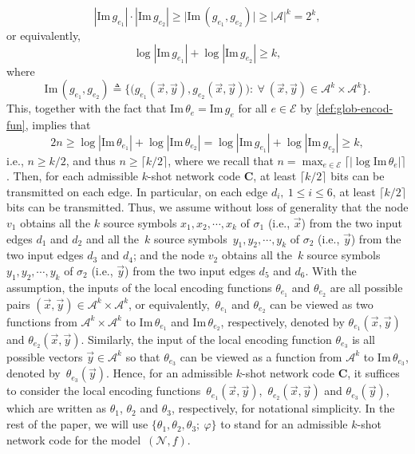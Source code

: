 \documentclass[11pt,draftclsnofoot,onecolumn]{IEEEtran}
\newcommand{\mbC}{\mathbf{C}}
\def\Im{\mathrm{Im}}
\begin{document}
{  \begin{equation}
|\Im\,g_{e_1}|\cdot|\Im\,g_{e_2}|\geq\big|\Im\,(g_{e_1},g_{e_2})\big|\geq |\mathcal{A}|^k=2^k,\nonumber
\end{equation}
or equivalently,
\begin{equation}
\log|\Im\,g_{e_1}|+\log|\Im\,g_{e_2}|\geq k,\nonumber
\end{equation}
where
\begin{equation}
\Im\,(g_{e_1},g_{e_2})\triangleq\Big\{\big(g_{e_1}(\vec{x},\vec{y}),g_{e_2}(\vec{x},\vec{y})\big):~\forall~
(\vec{x},\vec{y})\in\mathcal{A}^k\times\mathcal{A}^k\Big\}.\nonumber
\end{equation}
This, together with the fact that $\Im\,\theta_{e}=\Im\,g_{e}$ for all $e\in\mathcal{E}$ by \eqref{def:glob-encod-fun}, implies that
\begin{equation}
2n\geq \log|\Im\,\theta_{e_1}|+\log|\Im\,\theta_{e_2}|=\log|\Im\,g_{e_1}|+\log|\Im\,g_{e_2}|\geq k,
\nonumber
\end{equation}
i.e., $n\geq k/2$, and thus $n\geq \lceil k/2\rceil$, where we recall that $n=\max_{e\in\mathcal{E}}\big\lceil|\log\Im\,\theta_e|\big\rceil$. Then, for each admissible $k$-shot network
code $\mbC$, at least $\lceil k/2 \rceil$ bits can be transmitted on each edge.
In particular, on each edge $d_{i},~1\leq i\leq 6$, at least $\lceil k/2 \rceil$ bits can be transmitted.
Thus, we assume without loss of generality that the node $v_1$ obtains all the $k$ source symbols $x_{1},x_{2},\cdots,x_{k}$ of $\sigma_1$ (i.e., $\vec{x}$) from the two input edges $d_1$ and $d_2$ and all the~$k$ source symbols~$y_{1},y_{2},\cdots,y_{k}$  of $\sigma_2$ (i.e., $\vec{y}$) from the two input edges $d_3$ and $d_4$; and the node $v_2$ obtains all the~$k$ source symbols $y_{1},y_{2},\cdots,y_{k}$   of $\sigma_2$ (i.e., $\vec{y}$)  from the two input edges $d_5$ and $d_6$.
   With the assumption, the inputs of the local encoding functions $\theta_{e_1}$ and $\theta_{e_2}$ are all possible pairs $(\vec{x},\vec{y})\in\mathcal{A}^k\times\mathcal{A}^k$, or equivalently,~$\theta_{e_1}$ and $\theta_{e_2}$ can be viewed as two functions from $\mathcal{A}^k\times\mathcal{A}^k$ to $\Im\,\theta_{e_1}$ and $\Im\,\theta_{e_2}$, respectively, denoted by $\theta_{e_1}(\vec{x},\vec{y})$ and $\theta_{e_2}(\vec{x},\vec{y})$. Similarly, the input of the local encoding function $\theta_{e_3}$ is all possible vectors $\vec{y}\in\mathcal{A}^k$ so that $\theta_{e_3}$ can be viewed as a function from $\mathcal{A}^k$ to $\Im\,\theta_{e_3}$, denoted by~$\theta_{e_3}(\vec{y})$.
  Hence, for an admissible $k$-shot network code $\mbC$,
 it suffices to consider the   local encoding functions~$\theta_{e_1}(\vec{x},\vec{y})$,~$\theta_{e_2}(\vec{x},\vec{y})$ and $\theta_{e_3}(\vec{y})$, which are written as $\theta_{1}$, $\theta_{2}$ and $\theta_{3}$, respectively, for notational simplicity. In the rest of the paper, we will use $\big\{\theta_1,\theta_2,\theta_3;~\varphi\big\}$ to stand for an admissible $k$-shot network code for the model~$(\mathcal{N},f)$.

}
\end{document}
